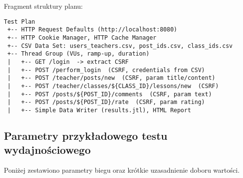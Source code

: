 Fragment struktury planu:

\begin{lstlisting}[caption={Fragment planu testów JMeter. Źródło: opracowanie własne},
  label={lst:jmeter-plan}, captionpos=b]
Test Plan
 +-- HTTP Request Defaults (http://localhost:8080)
 +-- HTTP Cookie Manager, HTTP Cache Manager
 +-- CSV Data Set: users_teachers.csv, post_ids.csv, class_ids.csv
 +-- Thread Group (VUs, ramp-up, duration)
 |   +-- GET /login  -> extract CSRF
 |   +-- POST /perform_login  (CSRF, credentials from CSV)
 |   +-- POST /teacher/posts/new  (CSRF, param title/content)
 |   +-- POST /teacher/classes/${CLASS_ID}/lessons/new  (CSRF)
 |   +-- POST /posts/${POST_ID}/comments  (CSRF, param text)
 |   +-- POST /posts/${POST_ID}/rate  (CSRF, param rating)
 |   +-- Simple Data Writer (results.jtl), HTML Report
\end{lstlisting}


\subsection{Parametry przykładowego testu wydajnościowego}

Poniżej zestawiono parametry biegu oraz krótkie uzasadnienie doboru wartości.

